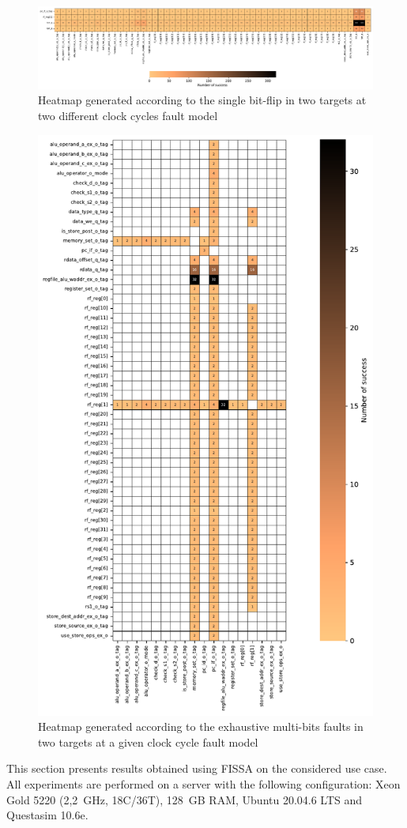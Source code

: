 \begin{figure}[t]
    \centering
    \includegraphics[width=\textwidth]{c4_fissa/img/heatmap/heatmap_buffer_overflow_wop_1_single_bitflip_temporel_2.pdf}
    \caption{Heatmap generated according to the single bit-flip in two targets at two different clock cycles fault model}
    \label{fig:heatmap_temporel}
\end{figure}

\begin{figure}[t]
    \centering
    \includegraphics[width=.5\linewidth]{c4_fissa/img/heatmap/heatmap_buffer_overflow_wop_1_multi_bitflip_reg_multi_2.pdf}
    \caption{Heatmap generated according to the exhaustive multi-bits faults in two targets at a given clock cycle fault model}
    \label{fig:heatmap_multi_reg_multi}
\end{figure}


This section presents results obtained using FISSA on the considered use case.
All experiments are performed on a server with the following configuration: Xeon Gold 5220 (2,2~GHz, 18C/36T), 128~GB RAM, Ubuntu 20.04.6 LTS and Questasim 10.6e.

